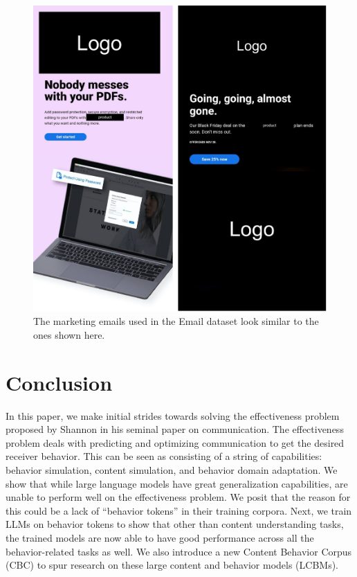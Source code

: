 \begin{figure}[!htbp]
    \centering
    \includegraphics[width=\textwidth]{images/email-ex-logo-redacted.pdf}
    \caption{The \companyName marketing emails used in the Email dataset look similar to the ones shown here.}
    \label{fig:figure-email-example-expanded}
\end{figure}




\section{Conclusion}
In this paper, we make initial strides towards solving the effectiveness problem proposed by Shannon in his seminal paper on communication. The effectiveness problem deals with predicting and optimizing communication to get the desired receiver behavior. This can be seen as consisting of a string of capabilities: behavior simulation, content simulation, and behavior domain adaptation. We show that while large language models have great generalization capabilities, are unable to perform well on the effectiveness problem. We posit that the reason for this could be a lack of ``behavior tokens'' in their training corpora. Next, we train LLMs on behavior tokens to show that other than content understanding tasks, the trained models are now able to have good performance across all the behavior-related tasks as well. We also introduce a new Content Behavior Corpus (CBC) to spur research on these large content and behavior models (LCBMs).

